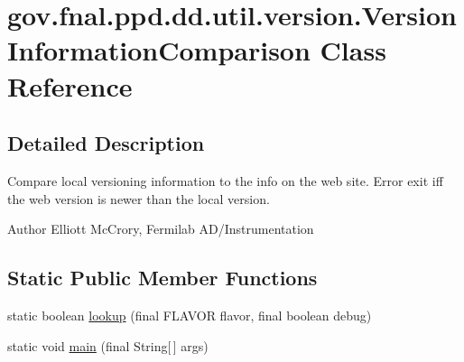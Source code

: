 \hypertarget{classgov_1_1fnal_1_1ppd_1_1dd_1_1util_1_1version_1_1VersionInformationComparison}{\section{gov.\-fnal.\-ppd.\-dd.\-util.\-version.\-Version\-Information\-Comparison Class Reference}
\label{classgov_1_1fnal_1_1ppd_1_1dd_1_1util_1_1version_1_1VersionInformationComparison}
}


\subsection{Detailed Description}
Compare local versioning information to the info on the web site. Error exit iff the web version is newer than the local version. 

\begin{DoxyAuthor}{Author}
Elliott Mc\-Crory, Fermilab A\-D/\-Instrumentation 
\end{DoxyAuthor}
\subsection*{Static Public Member Functions}
\begin{DoxyCompactItemize}
\item 
static boolean \hyperlink{classgov_1_1fnal_1_1ppd_1_1dd_1_1util_1_1version_1_1VersionInformationComparison_af1c5f9dd0b50c3fea2a6d7bb08992abb}{lookup} (final F\-L\-A\-V\-O\-R flavor, final boolean debug)
\item 
static void \hyperlink{classgov_1_1fnal_1_1ppd_1_1dd_1_1util_1_1version_1_1VersionInformationComparison_a34491a10aba931aef023f65cc0a63d00}{main} (final String\mbox{[}$\,$\mbox{]} args)
\end{DoxyCompactItemize}


